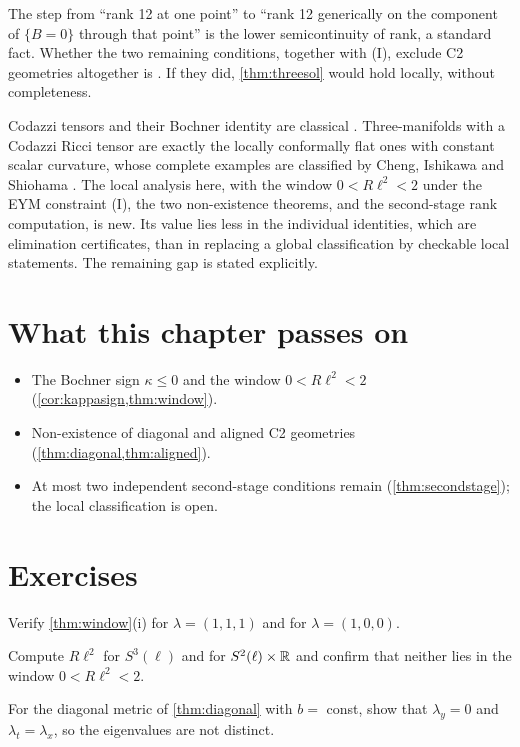 The step from ``rank 12 at one point'' to ``rank 12 generically on the component of $\{B=0\}$ through that point'' is the lower semicontinuity of rank, a standard fact. Whether the two remaining conditions, together with (I), exclude C2 geometries altogether is \opn. If they did, \cref{thm:threesol} would hold locally, without completeness.

\begin{litbox}
Codazzi tensors and their Bochner identity are classical \cite{Derdzinski1980}. Three-manifolds with a Codazzi Ricci tensor are exactly the locally conformally flat ones with constant scalar curvature, whose complete examples are classified by Cheng, Ishikawa and Shiohama \cite{CIS1999}. The local analysis here, with the window $0<R\ell^2<2$ under the EYM constraint (I), the two non-existence theorems, and the second-stage rank computation, is new. Its value lies less in the individual identities, which are elimination certificates, than in replacing a global classification by checkable local statements. The remaining gap is stated explicitly.
\end{litbox}

\section*{What this chapter passes on}
\begin{itemize}[nosep]
\item The Bochner sign $\kappa\le0$ and the window $0<R\ell^2<2$ (\cref{cor:kappasign,thm:window}).
\item Non-existence of diagonal and aligned C2 geometries (\cref{thm:diagonal,thm:aligned}).
\item At most two independent second-stage conditions remain (\cref{thm:secondstage}); the local classification is open.
\end{itemize}

\section*{Exercises}
\begin{exercise}
Verify \cref{thm:window}(i) for $\lambda=(1,1,1)$ and for $\lambda=(1,0,0)$.
\end{exercise}
\begin{exercise}
Compute $R\ell^2$ for $S^3(\ell)$ and for $S^2(\ell)\times\mathbb{R}$ and confirm that neither lies in the window $0<R\ell^2<2$.
\end{exercise}
\begin{exercise}
For the diagonal metric of \cref{thm:diagonal} with $b=$ const, show that $\lambda_y=0$ and $\lambda_t=\lambda_x$, so the eigenvalues are not distinct.
\end{exercise}

